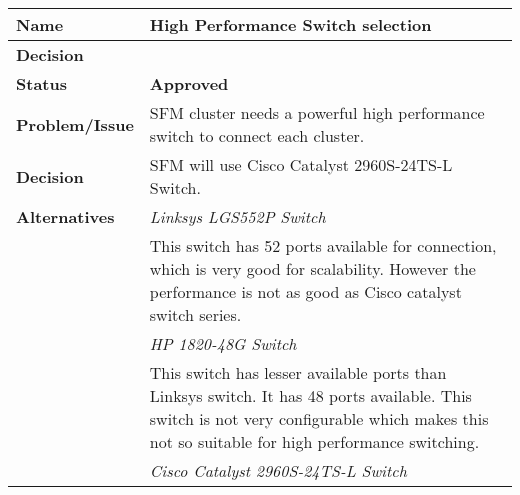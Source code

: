 \begin{table}[H]
	\begin{tabular}{L{0.2\textwidth} L{0.6\textwidth}}
		\textbf{Name}           & \textbf{High Performance Switch selection} \\ \toprule
		\textbf{Decision}       & \textbf{}\\ \midrule
		\textbf{Status}         & \textbf{Approved} \\ \midrule
		\textbf{Problem/Issue}  & SFM cluster needs a powerful high performance switch to connect each cluster. \\ \midrule
		\textbf{Decision}       & SFM will use Cisco Catalyst 2960S-24TS-L Switch.\\ \midrule
		\textbf{Alternatives}   & \textit{Linksys LGS552P Switch}\\
		& This switch has 52 ports available for connection, which is very good for scalability. However the performance is not as good as Cisco catalyst switch series.\\
		& \textit{HP 1820-48G Switch}\\
		& This switch has lesser available ports than Linksys switch. It has 48 ports available. This switch is not very configurable which makes this not so suitable for high performance switching. \\
		& \textit{Cisco Catalyst 2960S-24TS-L Switch} \\

\end{tabular}
\end{table}
